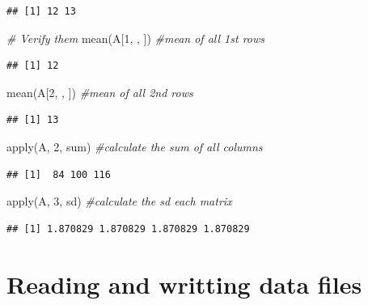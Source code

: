 \documentclass[
]{book}
\newenvironment{Shaded}{\begin{snugshade}}{\end{snugshade}}
\newcommand{\CommentTok}[1]{\textcolor[rgb]{0.56,0.35,0.01}{\textit{#1}}}
\newcommand{\DecValTok}[1]{\textcolor[rgb]{0.00,0.00,0.81}{#1}}
\newcommand{\FunctionTok}[1]{\textcolor[rgb]{0.00,0.00,0.00}{#1}}
\newcommand{\NormalTok}[1]{#1}
\begin{document}
\begin{verbatim}
## [1] 12 13
\end{verbatim}

\begin{Shaded}
\begin{Highlighting}[]
\CommentTok{\# Verify them}
\FunctionTok{mean}\NormalTok{(A[}\DecValTok{1}\NormalTok{, , ])         }\CommentTok{\#mean of all 1st rows}
\end{Highlighting}
\end{Shaded}

\begin{verbatim}
## [1] 12
\end{verbatim}

\begin{Shaded}
\begin{Highlighting}[]
\FunctionTok{mean}\NormalTok{(A[}\DecValTok{2}\NormalTok{, , ])         }\CommentTok{\#mean of all 2nd rows}
\end{Highlighting}
\end{Shaded}

\begin{verbatim}
## [1] 13
\end{verbatim}

\begin{Shaded}
\begin{Highlighting}[]
\FunctionTok{apply}\NormalTok{(A, }\DecValTok{2}\NormalTok{, sum)       }\CommentTok{\#calculate the sum of all columns}
\end{Highlighting}
\end{Shaded}

\begin{verbatim}
## [1]  84 100 116
\end{verbatim}

\begin{Shaded}
\begin{Highlighting}[]
\FunctionTok{apply}\NormalTok{(A, }\DecValTok{3}\NormalTok{, sd)        }\CommentTok{\#calculate the sd each matrix}
\end{Highlighting}
\end{Shaded}

\begin{verbatim}
## [1] 1.870829 1.870829 1.870829 1.870829
\end{verbatim}

\hypertarget{reading-and-writting-data-files}{%
\chapter{Reading and writting data files}\label{reading-and-writting-data-files}}
\end{document}
